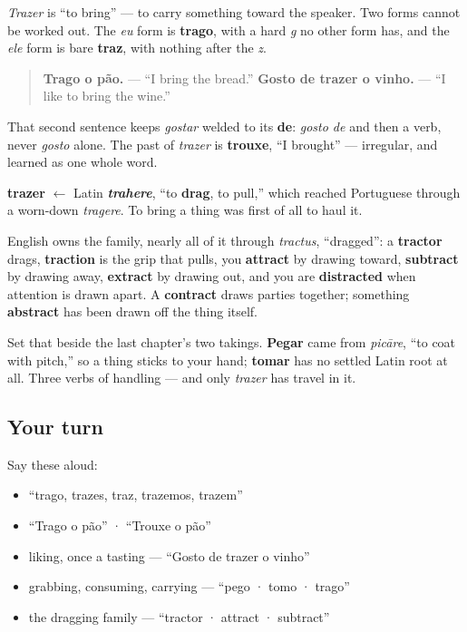 \emph{Trazer} is \textquotedblleft{}to bring\textquotedblright{} — to carry something toward the speaker. Two forms cannot be worked out. The \emph{eu} form is \textbf{trago}, with a hard \emph{g} no other form has, and the \emph{ele} form is bare \textbf{traz}, with nothing after the \emph{z}.

\begin{quote}
\textbf{Trago o pão.} — \textquotedblleft{}I bring the bread.\textquotedblright{} \textbf{Gosto de trazer o vinho.} — \textquotedblleft{}I like to bring the wine.\textquotedblright{}
\end{quote}

That second sentence keeps \emph{gostar} welded to its \textbf{de}: \emph{gosto de} and then a verb, never \emph{gosto} alone. The past of \emph{trazer} is \textbf{trouxe}, \textquotedblleft{}I brought\textquotedblright{} — irregular, and learned as one whole word.

\begin{cousinweb}
\textbf{trazer} $\leftarrow$ Latin \emph{\textbf{trahere}}, \textquotedblleft{}to \textbf{drag}, to pull,\textquotedblright{} which reached Portuguese through a worn-down \emph{tragere}. To bring a thing was first of all to haul it.

English owns the family, nearly all of it through \emph{tractus}, \textquotedblleft{}dragged\textquotedblright{}: a \textbf{tractor} drags, \textbf{traction} is the grip that pulls, you \textbf{attract} by drawing toward, \textbf{subtract} by drawing away, \textbf{extract} by drawing out, and you are \textbf{distracted} when attention is drawn apart. A \textbf{contract} draws parties together; something \textbf{abstract} has been drawn off the thing itself.

Set that beside the last chapter's two takings. \textbf{Pegar} came from \emph{picāre}, \textquotedblleft{}to coat with pitch,\textquotedblright{} so a thing sticks to your hand; \textbf{tomar} has no settled Latin root at all. Three verbs of handling — and only \emph{trazer} has travel in it.
\end{cousinweb}

\subsection*{Your turn}
Say these aloud:

\begin{itemize}
\raggedright
  \item \textquotedblleft{}trago, trazes, traz, trazemos, trazem\textquotedblright{}
  \item \textquotedblleft{}Trago o pão\textquotedblright{} · \textquotedblleft{}Trouxe o pão\textquotedblright{}
  \item liking, once a tasting — \textquotedblleft{}Gosto de trazer o vinho\textquotedblright{}
  \item grabbing, consuming, carrying — \textquotedblleft{}pego · tomo · trago\textquotedblright{}
  \item the dragging family — \textquotedblleft{}tractor · attract · subtract\textquotedblright{}
\end{itemize}


